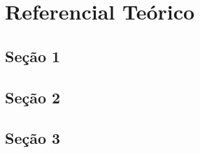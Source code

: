 \chapter{Referencial Teórico}
\label{chap:referencial-teorico}

\section{Seção 1}



\section{Seção 2}



\section{Seção 3}